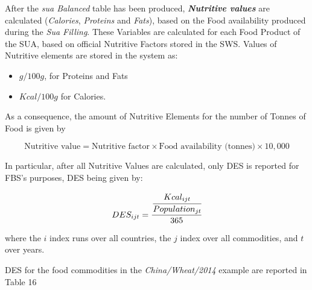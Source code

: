 \documentclass[]{article}
\providecommand{\tightlist}{%
  \setlength{\itemsep}{0pt}\setlength{\parskip}{0pt}}
\begin{document}
After the \emph{sua Balanced} table has been produced,
\textbf{\emph{Nutritive values}} are calculated (\emph{Calories},
\emph{Proteins} and \emph{Fats}), based on the Food availability
produced during the \emph{Sua Filling}. These Variables are calculated
for each Food Product of the SUA, based on official Nutritive Factors
stored in the SWS. Values of Nutritive elements are stored in the system
as:

\begin{itemize}
\tightlist
\item
  \(g/100g\), for Proteins and Fats
\item
  \(Kcal/100g\) for Calories.
\end{itemize}

As a consequence, the amount of Nutritive Elements for the number of
Tonnes of Food is given by

\begin{equation}
\label{eq:Nutritive}
\text{Nutritive value} = \text{Nutritive factor} \times \text{Food availability (tonnes)} \times 10,000
\end{equation}

In particular, after all Nutritive Values are calculated, only DES is
reported for FBS's purposes, DES being given by:

\begin{equation}
\label{eq:des}
 DES_{ijt} = \cfrac{\cfrac{Kcal_{ijt}}{Population_{jt}}}{365}
\end{equation}

where the \(i\) index runs over all countries, the \(j\) index over all
commodities, and \(t\) over years.

DES for the food commodities in the \emph{China/Wheat/2014} example are
reported in Table 16
\end{document}
